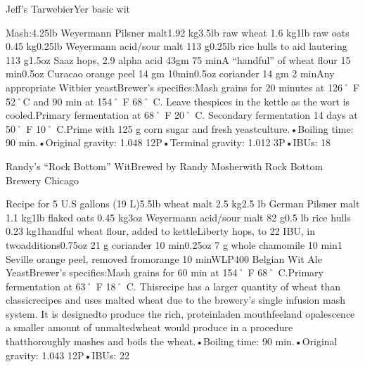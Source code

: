 \documentclass[a4paper,parskip=half]{scrartcl}
\begin{document}
Jeff’s TarwebierYer basic wit

Mash:4.25lb Weyermann Pilsner malt1.92 kg3.5lb raw wheat 1.6 kg1lb raw oats 0.45 kg0.25lb Weyermann acid/sour malt 113 g0.25lb rice hulls to aid lautering 113 g1.5oz Saaz hops, 2.9 alpha acid 43gm 75 minA “handful” of wheat ﬂour 15 min0.5oz Curacao orange peel 14 gm 10min0.5oz coriander 14 gm 2 minAny appropriate Witbier yeastBrewer’s speciﬁcs:Mash grains for 20 minutes at 126˚ F 52˚C and 90 min at 154˚ F 68˚ C. Leave thespices in the kettle as the wort is cooled.Primary fermentation at 68˚ F 20˚ C. Secondary fermentation 14 days at 50˚ F 10˚ C.Prime with 125 g corn sugar and fresh yeastculture.•Boiling time: 90 min.•Original gravity: 1.048 12P•Terminal gravity: 1.012 3P•IBUs: 18

Randy’s “Rock Bottom” WitBrewed by Randy Mosherwith Rock Bottom Brewery  Chicago

Recipe for 5 U.S gallons (19 L)5.5lb wheat malt 2.5 kg2.5 lb German Pilsner malt 1.1 kg1lb ﬂaked oats 0.45 kg3oz Weyermann acid/sour malt 82 g0.5 lb rice hulls 0.23 kg1handful wheat ﬂour, added to kettleLiberty hops, to 22 IBU, in twoadditions0.75oz 21 g coriander 10 min0.25oz 7 g whole chamomile 10 min1 Seville orange peel, removed fromorange 10 minWLP400  Belgian Wit Ale YeastBrewer’s speciﬁcs:Mash grains for 60 min at 154˚ F 68˚ C.Primary fermentation at 63˚ F 18˚ C. Thisrecipe has a larger quantity of wheat than classicrecipes and uses malted wheat due to the brewery’s single infusion mash system. It is designedto produce the rich, proteinladen mouthfeeland opalescence a smaller amount of unmaltedwheat would produce in a procedure thatthoroughly mashes and boils the wheat.•Boiling time: 90 min.•Original gravity: 1.043 12P•IBUs: 22

\parencite[30]{Sparrow2002} 
\end{document}
